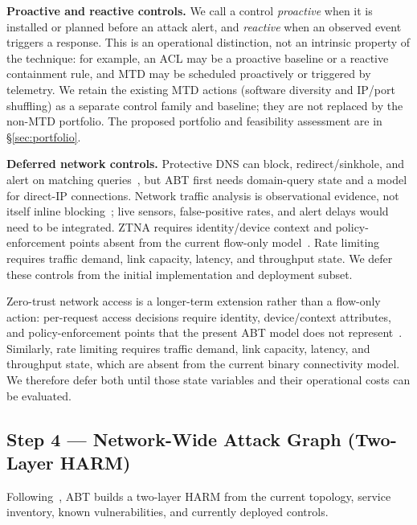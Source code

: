 \documentclass[conference]{IEEEtran}
\begin{document}
\textbf{Proactive and reactive controls.} We call a control \emph{proactive} when it
is installed or planned before an attack alert, and \emph{reactive} when an observed
event triggers a response. This is an operational distinction, not an intrinsic
property of the technique: for example, an ACL may be a proactive baseline or a
reactive containment rule, and MTD may be scheduled proactively or triggered by
telemetry. We retain the existing MTD actions (software diversity and IP/port
shuffling) as a separate control family and baseline; they are not replaced by the
non-MTD portfolio. The proposed portfolio and feasibility assessment are in
\S\ref{sec:portfolio}.

\textbf{Deferred network controls.} Protective DNS can block, redirect/sinkhole, and
alert on matching queries~\cite{cisapdns,d3fenddns}, but ABT first needs domain-query
state and a model for direct-IP connections. Network traffic analysis is
observational evidence, not itself inline blocking~\cite{d3fendnta}; live sensors,
false-positive rates, and alert delays would need to be integrated. ZTNA requires
identity/device context and policy-enforcement points absent from the current
flow-only model~\cite{nist800207,cisaztmm}. Rate limiting requires traffic demand,
link capacity, latency, and throughput state. We defer these controls from the
initial implementation and deployment subset.

Zero-trust network access is a longer-term extension rather than a flow-only
action: per-request access decisions require identity, device/context attributes,
and policy-enforcement points that the present ABT model does not
represent~\cite{nist800207,cisaztmm}. Similarly, rate limiting requires traffic
demand, link capacity, latency, and throughput state, which are absent from the
current binary connectivity model. We therefore defer both until those state
variables and their operational costs can be evaluated.

\subsection{Step 4 --- Network-Wide Attack Graph (Two-Layer HARM)}
\label{sec:harm}

Following~\cite{harmer2020}, ABT builds a two-layer HARM from the current topology,
service inventory, known vulnerabilities, and currently deployed controls.
\end{document}
